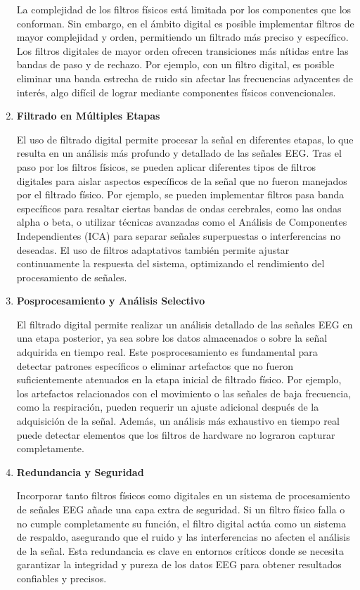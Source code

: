 \documentclass{article}
\begin{document}
\begin{enumerate}
    La complejidad de los filtros físicos está limitada por los componentes que los conforman. Sin embargo, en el ámbito digital es posible implementar filtros de mayor complejidad y orden, permitiendo un filtrado más preciso y específico. Los filtros digitales de mayor orden ofrecen transiciones más nítidas entre las bandas de paso y de rechazo. Por ejemplo, con un filtro digital, es posible eliminar una banda estrecha de ruido sin afectar las frecuencias adyacentes de interés, algo difícil de lograr mediante componentes físicos convencionales.
    \item \textbf{Filtrado en Múltiples Etapas}
    
    El uso de filtrado digital permite procesar la señal en diferentes etapas, lo que resulta en un análisis más profundo y detallado de las señales EEG. Tras el paso por los filtros físicos, se pueden aplicar diferentes tipos de filtros digitales para aislar aspectos específicos de la señal que no fueron manejados por el filtrado físico. Por ejemplo, se pueden implementar filtros pasa banda específicos para resaltar ciertas bandas de ondas cerebrales, como las ondas alpha o beta, o utilizar técnicas avanzadas como el Análisis de Componentes Independientes (ICA) para separar señales superpuestas o interferencias no deseadas. El uso de filtros adaptativos también permite ajustar continuamente la respuesta del sistema, optimizando el rendimiento del procesamiento de señales.
    \item \textbf{Posprocesamiento y Análisis Selectivo}
    
    El filtrado digital permite realizar un análisis detallado de las señales EEG en una etapa posterior, ya sea sobre los datos almacenados o sobre la señal adquirida en tiempo real. Este posprocesamiento es fundamental para detectar patrones específicos o eliminar artefactos que no fueron suficientemente atenuados en la etapa inicial de filtrado físico. Por ejemplo, los artefactos relacionados con el movimiento o las señales de baja frecuencia, como la respiración, pueden requerir un ajuste adicional después de la adquisición de la señal. Además, un análisis más exhaustivo en tiempo real puede detectar elementos que los filtros de hardware no lograron capturar completamente.
    \item \textbf{Redundancia y Seguridad}
    
    Incorporar tanto filtros físicos como digitales en un sistema de procesamiento de señales EEG añade una capa extra de seguridad. Si un filtro físico falla o no cumple completamente su función, el filtro digital actúa como un sistema de respaldo, asegurando que el ruido y las interferencias no afecten el análisis de la señal. Esta redundancia es clave en entornos críticos donde se necesita garantizar la integridad y pureza de los datos EEG para obtener resultados confiables y precisos.
\end{enumerate}
\end{document}
